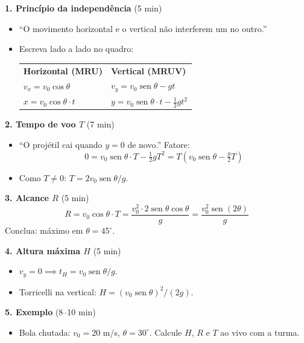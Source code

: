 \documentclass[12pt,a4paper]{article}
\begin{document}
\begin{tcolorbox}[quadrobox]
  \textbf{1. Princ\'ipio da independ\^encia} (5 min)
  \begin{itemize}[nosep]
    \item ``O movimento horizontal e o vertical n\~ao interferem um no
          outro.''
    \item Escreva lado a lado no quadro:

    \medskip
    \begin{tabular}{ll}
      \textbf{Horizontal (MRU)} & \textbf{Vertical (MRUV)} \\
      $v_x = v_0\cos\theta$ & $v_y = v_0\operatorname{sen}\theta - gt$ \\
      $x = v_0\cos\theta\cdot t$ &
        $y = v_0\operatorname{sen}\theta\cdot t - \tfrac{1}{2}gt^2$ \\
    \end{tabular}
  \end{itemize}

  \medskip
  \textbf{2. Tempo de voo $T$} (7 min)
  \begin{itemize}[nosep]
    \item ``O proj\'etil cai quando $y = 0$ de novo.'' Fatore:
    \[
      0 = v_0\operatorname{sen}\theta\cdot T
          - \tfrac{1}{2}g T^2
        = T\!\left(v_0\operatorname{sen}\theta - \tfrac{g}{2}T\right)
    \]
    \item Como $T \neq 0$: $T = 2v_0\operatorname{sen}\theta/g$.
  \end{itemize}

  \medskip
  \textbf{3. Alcance $R$} (5 min)
  \[
    R = v_0\cos\theta\cdot T = \frac{v_0^2\cdot 2\operatorname{sen}\theta\cos\theta}{g}
      = \frac{v_0^2\operatorname{sen}(2\theta)}{g}
  \]
  Conclua: m\'aximo em $\theta = 45^\circ$.

  \medskip
  \textbf{4. Altura m\'axima $H$} (5 min)
  \begin{itemize}[nosep]
    \item $v_y = 0 \implies t_H = v_0\operatorname{sen}\theta/g$.
    \item Torricelli na vertical:
    $H = (v_0\operatorname{sen}\theta)^2/(2g)$.
  \end{itemize}

  \medskip
  \textbf{5. Exemplo} (8--10 min)
  \begin{itemize}[nosep]
    \item Bola chutada: $v_0 = 20$ m/s, $\theta = 30^\circ$.
          Calcule $H$, $R$ e $T$ ao vivo com a turma.
  \end{itemize}
\end{tcolorbox}
\end{document}
